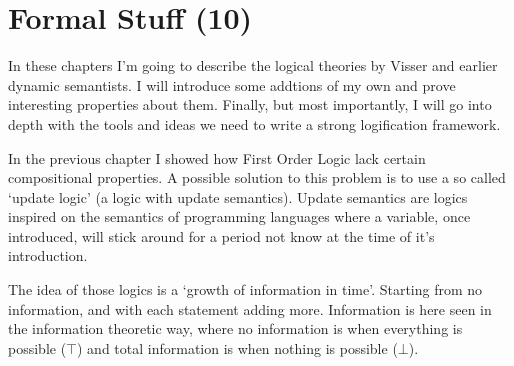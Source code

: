 \documentclass[12pt]{article}
\let\stdsection\section
\renewcommand\section{\newpage\stdsection}
\begin{document}
\section{Formal Stuff (10)}


In these chapters I'm going to describe the logical theories by Visser and earlier dynamic semantists. I will introduce some addtions of my own and prove interesting properties about them. Finally, but most importantly, I will go into depth with the tools and ideas we need to write a strong logification framework.

In the previous chapter I showed how First Order Logic lack certain compositional properties. A possible solution to this problem is to use a so called `update logic' (a logic with update semantics). Update semantics are logics inspired on the semantics of programming languages where a variable, once introduced, will stick around for a period not know at the time of it's introduction.

The idea of those logics is a `growth of information in time'. Starting from no information, and with each statement adding more. Information is here seen in the information theoretic way, where no information is when everything is possible ($\top$) and total information is when nothing is possible ($\bot$).
\end{document}
